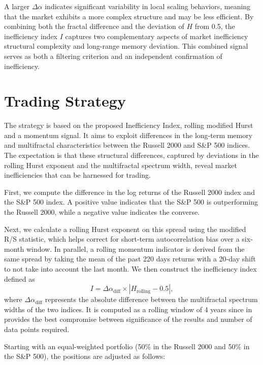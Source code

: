 \documentclass[11pt]{extarticle}
\begin{document}
A larger $\Delta \alpha$ indicates significant variability in local scaling behaviors,
meaning that the market exhibits a more complex structure and may be less efficient. By
combining both the fractal difference and the deviation of $H$ from 0.5, the inefficiency index $I$
captures two complementary aspects of market inefficiency structural complexity and long-range memory deviation.
This combined signal serves as both a filtering criterion and an independent confirmation of inefficiency.



\section{Trading Strategy}

The strategy is based on the proposed Inefficiency Index, rolling modified Hurst and a momentum signal. It aims to exploit differences in the
long-term memory and multifractal characteristics between the Russell 2000 and S\&P 500 indices. The expectation is that
these structural differences, captured by deviations in the rolling Hurst exponent and the multifractal spectrum width,
reveal market inefficiencies that can be harnessed for trading.

First, we compute the difference in the log returns of the Russell 2000 index and the S\&P 500 index. A positive value
indicates that the S\&P 500 is outperforming the Russell 2000, while a negative value indicates the converse.

Next, we calculate a rolling Hurst exponent on this spread using the modified R/S statistic, which helps correct for
short-term autocorrelation bias over a six‐month window. In parallel, a rolling momentum indicator is derived from the
same spread by taking the mean of the past 220 days returns with a 20‐day shift to not take into account the last month.
We then construct the inefficiency index defined as
\[
I = \Delta\alpha_{\text{diff}} \times \left|H_{\text{rolling}} - 0.5\right|,
\]
where \(\Delta \alpha_{\text{diff}}\) represents the absolute difference between the multifractal spectrum widths of the two
indices. It is computed as a rolling window of 4 years since in provides the best compromise between significance of the results
and number of data points required.

Starting with an equal-weighted portfolio (50\% in the Russell 2000 and 50\% in the S\&P 500), the positions are adjusted as follows:
\end{document}
